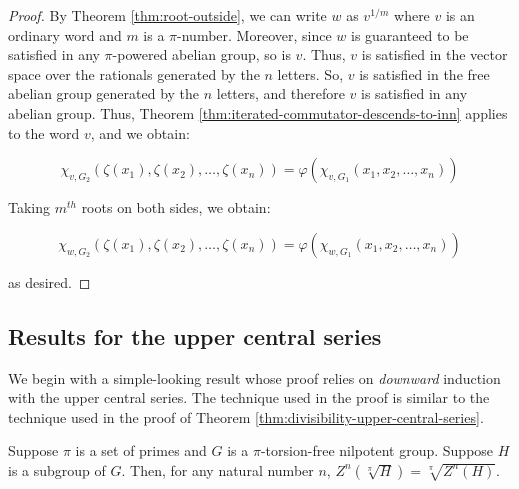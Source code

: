 \begin{proof}
  By Theorem \ref{thm:root-outside}, we can write $w$ as $v^{1/m}$
  where $v$ is an ordinary word and $m$ is a $\pi$-number. Moreover,
  since $w$ is guaranteed to be satisfied in any $\pi$-powered abelian
  group, so is $v$. Thus, $v$ is satisfied in the vector space over
  the rationals generated by the $n$ letters. So, $v$ is satisfied in
  the free abelian group generated by the $n$ letters, and therefore
  $v$ is satisfied in any abelian group. Thus, Theorem
  \ref{thm:iterated-commutator-descends-to-inn} applies to the word
  $v$, and we obtain:

  $$\chi_{v,G_2}(\zeta(x_1),\zeta(x_2),\dots,\zeta(x_n)) = \varphi(\chi_{v,G_1}(x_1,x_2,\dots,x_n))$$

  Taking $m^{th}$ roots on both sides, we obtain:

  $$\chi_{w,G_2}(\zeta(x_1),\zeta(x_2),\dots,\zeta(x_n)) = \varphi(\chi_{w,G_1}(x_1,x_2,\dots,x_n))$$

  as desired.
\end{proof}


\subsection{Results for the upper central series}

We begin with a simple-looking result whose proof relies on {\em
  downward} induction with the upper central series. The technique
used in the proof is similar to the technique used in the proof of
Theorem \ref{thm:divisibility-upper-central-series}.

\begin{lemma}\label{lemma:ucs-root-commute}
  Suppose $\pi$ is a set of primes and $G$ is a $\pi$-torsion-free
  nilpotent group. Suppose $H$ is a subgroup of $G$. Then, for any
  natural number $n$, $Z^n(\sqrt[\pi]{H}) = \sqrt[\pi]{Z^n(H)}$.
\end{lemma}

